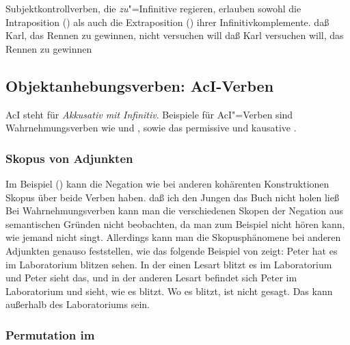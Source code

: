Subjektkontrollverben, die \emph{zu}"=Infinitive regieren, 
erlauben sowohl die Intraposition () als auch die Extraposition
() ihrer Infinitivkomplemente.
\ea
daß Karl, das Rennen zu gewinnen, nicht versuchen will
\z
\ea
daß    Karl versuchen will,    das Rennen zu gewinnen
\z
{}%

\subsection{Objektanhebungsverben: AcI-Verben}
\label{sec-aci}

AcI
steht für \emph{Akkusativ mit Infinitiv}. 
Beispiele für AcI"=Verben sind Wahrnehmungsverben wie  und 
, sowie das permissive und kausative . 

\subsubsection{Skopus von Adjunkten}
\label{sec-aci-scope}

Im Beispiel () kann die Negation wie bei anderen kohärenten Konstruktionen
Skopus über beide Verben haben.
\ea
daß ich den Jungen das Buch nicht holen ließ
\z
%
Bei Wahrnehmungsverben kann man die verschiedenen Skopen der Negation
aus semantischen Gründen nicht beobachten, da man zum Beispiel
nicht hören kann, wie jemand nicht singt. Allerdings kann man
die Skopusphänomene bei anderen Adjunkten genauso feststellen, wie
das folgende Beispiel von \citet[]{Puetz82a}
zeigt:
\ea
Peter hat es im Laboratorium blitzen sehen.
\z
In der einen Lesart blitzt es im Laboratorium und Peter sieht das, und
in der anderen Lesart befindet sich Peter im Laboratorium und sieht,
wie es blitzt. Wo es blitzt, ist nicht gesagt. Das kann außerhalb
des Laboratoriums sein.


\subsubsection{Permutation im \mf}
\label{sec-aci-perm-mf}


